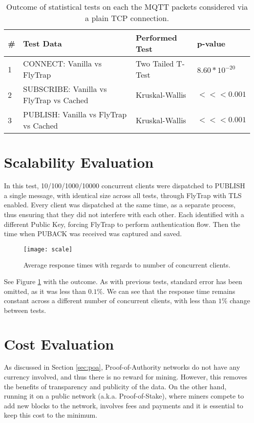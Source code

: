 \begin{table}[h]
\centering
\begin{tabular}{|l|l|l|l|}
\hline
\textbf{\#} & \textbf{Test Data}                       & \textbf{Performed Test} & \textbf{p-value}                      \\ \hline
1           & CONNECT: Vanilla vs FlyTrap              & Two Tailed T-Test       & $8.60*10^{-20}$                    \\ \hline
2           & SUBSCRIBE: Vanilla vs FlyTrap vs Cached & Kruskal-Wallis          & $<<< 0.001$ \\ \hline
3           & PUBLISH: Vanilla vs FlyTrap vs Cached & Kruskal-Wallis          & $<<< 0.001$ \\ \hline
\end{tabular}
\caption{Outcome of statistical tests on each the MQTT packets considered via a plain TCP connection.}
\label{tab:ttest-notls}
\end{table}


\section{Scalability Evaluation}
In this test, 10/100/1000/10000 concurrent clients were dispatched to PUBLISH a single message, with identical size across all tests, through FlyTrap with TLS enabled. Every client was dispatched at the same time, as a separate process, thus ensuring that they did not interfere with each other. Each identified with a different Public Key, forcing FlyTrap to perform authentication flow. Then the time when PUBACK was received was captured and saved.

\begin{figure}[h]
    \centering
    \texttt{[image: scale]}
    \caption{Average response times with regards to number of concurrent clients.}
    \label{fig:scale}
\end{figure}
See Figure \ref{fig:scale} with the outcome. As with previous tests, standard error has been omitted, as it was less than $0.1\%$. We can see that the response time remains constant across a different number of concurrent clients, with less than $1\%$ change between tests.

\section{Cost Evaluation}
As discussed in Section \ref{sec:poa}, Proof-of-Authority networks do not have any currency involved, and thus there is no reward for mining. However, this removes the benefits of transparency and publicity of the data. On the other hand, running it on a public network (a.k.a. Proof-of-Stake), where miners compete to add new blocks to the network, involves fees and payments and it is essential to keep this cost to the minimum.

